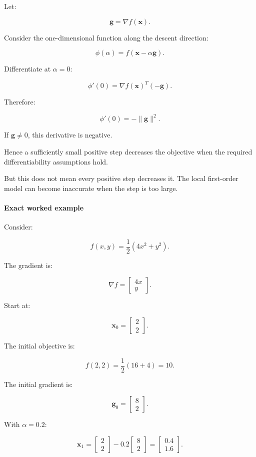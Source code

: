 Let:

\[
\mathbf g=\nabla f(\mathbf x).
\]

Consider the one-dimensional function along the descent direction:

\[
\phi(\alpha)=f(\mathbf x-\alpha\mathbf g).
\]

Differentiate at \(\alpha=0\):

\[
\phi'(0)= \nabla f(\mathbf x)^T(-\mathbf g).
\]

Therefore:

\[
\boxed{ \phi'(0)=-\|\mathbf g\|^2 }.
\]

If \(\mathbf g\ne0\), this derivative is negative.

Hence a sufficiently small positive step decreases the objective when the required differentiability assumptions hold.

But this does not mean every positive step decreases it. The local first-order model can become inaccurate when the step is too large.

\paragraph{Exact worked example}\label{02-foundations-ii-ch026-exact-worked-example}

Consider:

\[
f(x,y)=\frac12(4x^2+y^2).
\]

The gradient is:

\[
\nabla f= \begin{bmatrix} 4x\\y \end{bmatrix}.
\]

Start at:

\[
\mathbf x_0= \begin{bmatrix}2\\2\end{bmatrix}.
\]

The initial objective is:

\[
f(2,2)=\frac12(16+4)=10.
\]

The initial gradient is:

\[
\mathbf g_0= \begin{bmatrix}8\\2\end{bmatrix}.
\]

With \(\alpha=0.2\):

\[
\mathbf x_1= \begin{bmatrix}2\\2\end{bmatrix} - 0.2 \begin{bmatrix}8\\2\end{bmatrix} = \begin{bmatrix}0.4\\1.6\end{bmatrix}.
\]

